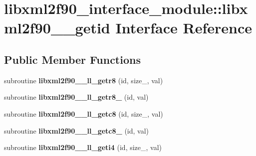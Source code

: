 \hypertarget{interfacelibxml2f90__interface__module_1_1libxml2f90____getid}{
\section{libxml2f90\_\-interface\_\-module::libxml2f90\_\-\_\-getid Interface Reference}
\label{interfacelibxml2f90__interface__module_1_1libxml2f90____getid}
}
\subsection*{Public Member Functions}
\begin{DoxyCompactItemize}
\item 
\hypertarget{interfacelibxml2f90__interface__module_1_1libxml2f90____getid_a90184cbc2223f83811ff517939872f6c}{
subroutine {\bfseries libxml2f90\_\-\_\-ll\_\-getr8} (id, size\_\-, val)}
\label{interfacelibxml2f90__interface__module_1_1libxml2f90____getid_a90184cbc2223f83811ff517939872f6c}

\item 
\hypertarget{interfacelibxml2f90__interface__module_1_1libxml2f90____getid_ab2ba4178858481e2205e5e3ae25ffff5}{
subroutine {\bfseries libxml2f90\_\-\_\-ll\_\-getr8\_\-} (id, val)}
\label{interfacelibxml2f90__interface__module_1_1libxml2f90____getid_ab2ba4178858481e2205e5e3ae25ffff5}

\item 
\hypertarget{interfacelibxml2f90__interface__module_1_1libxml2f90____getid_a17544d6ab6b7ad80326168cd5c491188}{
subroutine {\bfseries libxml2f90\_\-\_\-ll\_\-getc8} (id, size\_\-, val)}
\label{interfacelibxml2f90__interface__module_1_1libxml2f90____getid_a17544d6ab6b7ad80326168cd5c491188}

\item 
\hypertarget{interfacelibxml2f90__interface__module_1_1libxml2f90____getid_a77c23dfe5d971b6c13266a7911e19a58}{
subroutine {\bfseries libxml2f90\_\-\_\-ll\_\-getc8\_\-} (id, val)}
\label{interfacelibxml2f90__interface__module_1_1libxml2f90____getid_a77c23dfe5d971b6c13266a7911e19a58}

\item 
\hypertarget{interfacelibxml2f90__interface__module_1_1libxml2f90____getid_ac27030a8c987e2a8b2ecbd17d196048e}{
subroutine {\bfseries libxml2f90\_\-\_\-ll\_\-geti4} (id, size\_\-, val)}
\label{interfacelibxml2f90__interface__module_1_1libxml2f90____getid_ac27030a8c987e2a8b2ecbd17d196048e}


\end{DoxyCompactItemize}
